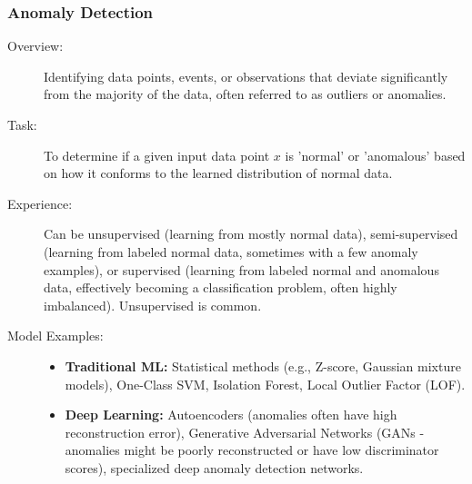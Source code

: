 \documentclass{article}
\begin{document}
\subsubsection{Anomaly Detection}
\begin{description}
    \item[Overview:] Identifying data points, events, or observations that deviate significantly from the majority of the data, often referred to as outliers or anomalies.
    \item[Task:] To determine if a given input data point $x$ is 'normal' or 'anomalous' based on how it conforms to the learned distribution of normal data.
    \item[Experience:] Can be unsupervised (learning from mostly normal data), semi-supervised (learning from labeled normal data, sometimes with a few anomaly examples), or supervised (learning from labeled normal and anomalous data, effectively becoming a classification problem, often highly imbalanced). Unsupervised is common.
    \item[Model Examples:]
        \begin{itemize}
            \item \textbf{Traditional ML:} Statistical methods (e.g., Z-score, Gaussian mixture models), One-Class SVM, Isolation Forest, Local Outlier Factor (LOF).
            \item \textbf{Deep Learning:} Autoencoders (anomalies often have high reconstruction error), Generative Adversarial Networks (GANs - anomalies might be poorly reconstructed or have low discriminator scores), specialized deep anomaly detection networks.
        \end{itemize}
\end{description}
\end{document}
